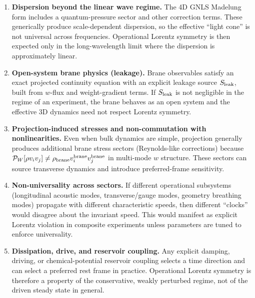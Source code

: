 \documentclass[11pt]{article}
\begin{document}
\begin{enumerate}
\item \textbf{Dispersion beyond the linear wave regime.}
The 4D GNLS Madelung form includes a quantum-pressure sector and other correction terms.
These generically produce scale-dependent dispersion, so the effective ``light cone'' is not
universal across frequencies. Operational Lorentz symmetry is then expected only in the
long-wavelength limit where the dispersion is approximately linear.

\item \textbf{Open-system brane physics (leakage).}
Brane observables satisfy an exact projected continuity equation with an explicit leakage
source $S_{\rm leak}$, built from $w$-flux and weight-gradient terms. If $S_{\rm leak}$ is not
negligible in the regime of an experiment, the brane behaves as an open system and the
effective 3D dynamics need not respect Lorentz symmetry.

\item \textbf{Projection-induced stresses and non-commutation with nonlinearities.}
Even when bulk dynamics are simple, projection generally produces additional brane stress
sectors (Reynolds-like corrections) because $\mathcal P_W[\rho v_iv_j]\neq
\rho_{\rm brane}v^{\rm brane}_i v^{\rm brane}_j$ in multi-mode $w$ structure.
These sectors can source transverse dynamics and introduce preferred-frame sensitivity.

\item \textbf{Non-universality across sectors.}
If different operational subsystems (longitudinal acoustic modes, transverse/gauge modes,
geometry breathing modes) propagate with different characteristic speeds, then different
``clocks'' would disagree about the invariant speed. This would manifest as explicit Lorentz
violation in composite experiments unless parameters are tuned to enforce universality.

\item \textbf{Dissipation, drive, and reservoir coupling.}
Any explicit damping, driving, or chemical-potential reservoir coupling selects a time direction
and can select a preferred rest frame in practice. Operational Lorentz symmetry is therefore a
property of the conservative, weakly perturbed regime, not of the driven steady state in general.
\end{enumerate}
\end{document}

